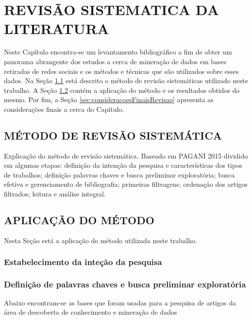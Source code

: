 
\chapter{REVISÃO SISTEMATICA DA LITERATURA}
\label{chap:revisaoSistematica}
Neste Capítulo encontra-se um levantamento bibliográfico a fim de obter um panorama abrangente dos estudos a cerca de mineração de dados em bases retiradas de redes sociais e os métodos e técnicas que são utilizados sobre esses dados. Na Seção \ref{sec:metodoRevisao} está descrito o método de revisão sistemáticas utilizado neste trabalho. A Seção \ref{sec:aplicacaoRevisao} contém a aplicação do método e os resultados obtidos do mesmo. Por fim, a Seção \ref{sec:consideracoesFinaisRevisao} apresenta as considerações finais a cerca do Capítulo.

\section{MÉTODO DE REVISÃO SISTEMÁTICA}
\label{sec:metodoRevisao}
Explicação do método de revisão sistemática. Baseado em PAGANI 2015 dividido em algumas etapas: definição da intenção da pesquisa e características dos tipos de trabalhos; definição palavras chaves e busca preliminar exploratória; busca efetiva e gerenciamento de bibliografia; primeiras filtragens; ordenação dos artigos filtrados; leitura e análise integral.

\section{APLICAÇÃO DO MÉTODO}
\label{sec:aplicacaoRevisao}
Nesta Seção está a aplicação do método utilizada neste trabalho.

\subsection{Estabelecimento da inteção da pesquisa}
\label{subsec:intencaoPesquisaRevisao}

\subsection{Definição de palavras chaves e busca preliminar exploratória}
\label{subsec:buscaExploratoriaRevisao}

Abaixo encontram-se as bases que foram usadas para a pesquisa de artigos da área de descoberta de conhecimento e mineração de dados

